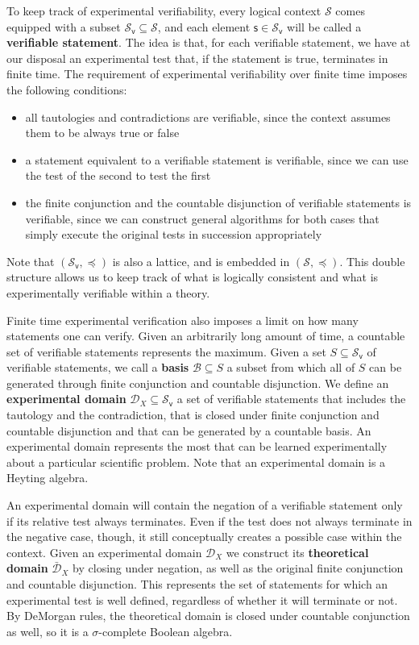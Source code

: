 \documentclass[submission,copyright,creativecommons]{eptcs}
\def\logCtx{\mathcal{S}}
\def\vstmtSet{\mathcal{S}_\textsf{v}}
\newcommand{\stmt}[1][s] {\mathsf{#1}} %
\def\narrower{\preccurlyeq} %
\newcommand{\edomain}[1][D] {\mathcal{#1}} %
\newcommand{\tdomain}[1][D] {\bar{\mathcal{#1}}} %
\newcommand{\basis}[1][B] {\mathcal{#1}} %
\begin{document}
To keep track of experimental verifiability, every logical context $\logCtx$ comes equipped with a subset $\vstmtSet \subseteq \logCtx$, and each element $\stmt \in \vstmtSet$ will be called a \textbf{verifiable statement}. The idea is that, for each verifiable statement, we have at our disposal an experimental test that, if the statement is true, terminates in finite time. The requirement of experimental verifiability over finite time imposes the following conditions:
\begin{itemize}
	\item all tautologies and contradictions are verifiable, since the context assumes them to be always true or false
	\item a statement equivalent to a verifiable statement is verifiable, since we can use the test of the second to test the first
	\item the finite conjunction and the countable disjunction of verifiable statements is verifiable, since we can construct general algorithms for both cases that simply execute the original tests in succession appropriately
\end{itemize}
Note that $(\vstmtSet, \narrower)$ is also a lattice, and is embedded in $(\logCtx, \narrower)$. This double structure allows us to keep track of what is logically consistent and what is experimentally verifiable within a theory.

Finite time experimental verification also imposes a limit on how many statements one can verify. Given an arbitrarily long amount of time, a countable set of verifiable statements represents the maximum. Given a set $S \subseteq \vstmtSet$ of verifiable statements, we call a \textbf{basis} $\basis \subseteq S$ a subset from which all of $S$ can be generated through finite conjunction and countable disjunction. We define an \textbf{experimental domain} $\edomain_X \subseteq \vstmtSet$ a set of verifiable statements that includes the tautology and the contradiction, that is closed under finite conjunction and countable disjunction and that can be generated by a countable basis. An experimental domain represents the most that can be learned experimentally about a particular scientific problem. Note that an experimental domain is a Heyting algebra.

An experimental domain will contain the negation of a verifiable statement only if its relative test always terminates. Even if the test does not always terminate in the negative case, though, it still conceptually creates a possible case within the context. Given an experimental domain $\edomain_X$ we construct its \textbf{theoretical domain} $\tdomain_X$ by closing under negation, as well as the original finite conjunction and countable disjunction. This represents the set of statements for which an experimental test is well defined, regardless of whether it will terminate or not. By DeMorgan rules, the theoretical domain is closed under countable conjunction as well, so it is a $\sigma$-complete Boolean algebra.
\end{document}
